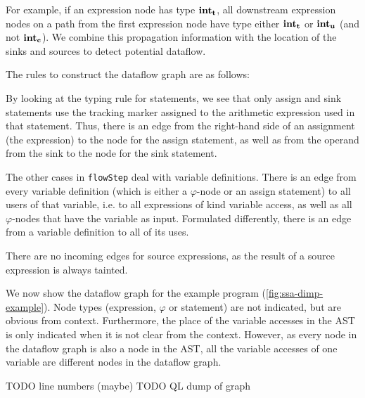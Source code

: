 For example, if an expression node has type $\textbf{int}_\textbf{t}$,
all downstream expression nodes on a path from the first expression node 
have type either $\textbf{int}_\textbf{t}$ or $\textbf{int}_\textbf{u}$ (and not $\textbf{int}_\textbf{c}$).
We combine this propagation information with the location of the sinks and sources 
to detect potential dataflow.

The rules to construct the dataflow graph are as follows:

By looking at the typing rule for statements, we see that only assign and sink statements
use the tracking marker assigned to the arithmetic expression used in that statement.
Thus, there is an edge from the right-hand side of an assignment (the expression) 
to the node for the assign statement, as well as from the operand from the sink 
to the node for the sink statement.

The other cases in \texttt{flowStep} deal with variable definitions.
There is an edge from every variable definition (which is either a $\varphi$-node or 
an assign statement) to all users of that variable, i.e. to all expressions of kind
variable access, as well as all $\varphi$-nodes that have the variable as input.
Formulated differently, there is an edge from a variable definition to all of its uses.

There are no incoming edges for source expressions, as the result of a source expression
is always tainted.

We now show the dataflow graph for the example program (\autoref{fig:ssa-dimp-example}).
Node types (expression, $\varphi$ or statement) are not indicated, but are obvious from context.
Furthermore, the place of the variable accesses in the AST is only indicated when it is 
not clear from the context.
However, as every node in the dataflow graph is also a node in the AST, all the variable accesses
of one variable are different nodes in the dataflow graph.

TODO line numbers (maybe)
TODO QL dump of graph

